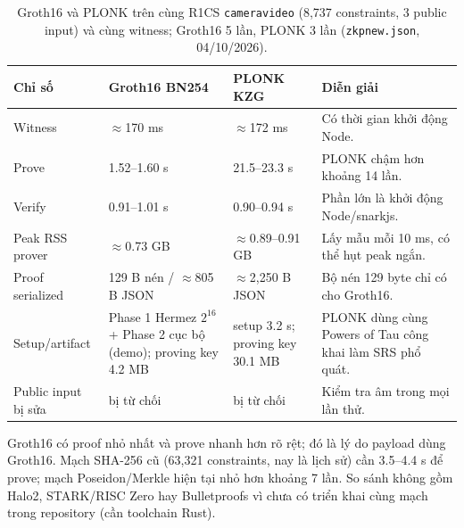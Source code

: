 \documentclass[11pt,a4paper]{article}
\renewcommand{\_}{\origunderscore\allowbreak}
\begin{document}
\begin{table}[H]\centering\small
\caption{Groth16 và PLONK trên cùng R1CS \texttt{camera\_video} (8,737 constraints, 3 public input) và cùng witness; Groth16 5 lần, PLONK 3 lần (\texttt{zkp\_new.json}, 04/10/2026).}
\begin{tabularx}{\textwidth}{p{3cm}p{3.1cm}p{3.1cm}X}\toprule
Chỉ số & Groth16 BN254 & PLONK KZG & Diễn giải\\\midrule
Witness & $\approx$170 ms & $\approx$172 ms & Có thời gian khởi động Node.\\
Prove & 1.52--1.60 s & 21.5--23.3 s & PLONK chậm hơn khoảng 14 lần.\\
Verify & 0.91--1.01 s & 0.90--0.94 s & Phần lớn là khởi động Node/snarkjs.\\
Peak RSS prover & $\approx$0.73 GB & $\approx$0.89--0.91 GB & Lấy mẫu mỗi 10 ms, có thể hụt peak ngắn.\\
Proof serialized & 129 B nén / $\approx$805 B JSON & $\approx$2,250 B JSON & Bộ nén 129 byte chỉ có cho Groth16.\\
Setup/artifact & Phase 1 Hermez $2^{16}$ + Phase 2 cục bộ (demo); proving key 4.2 MB & setup 3.2 s; proving key 30.1 MB & PLONK dùng cùng Powers of Tau công khai làm SRS phổ quát.\\
Public input bị sửa & bị từ chối & bị từ chối & Kiểm tra âm trong mọi lần thử.\\
\bottomrule\end{tabularx}
\end{table}
Groth16 có proof nhỏ nhất và prove nhanh hơn rõ rệt; đó là lý do payload dùng Groth16. Mạch SHA-256 cũ (63,321 constraints, nay là lịch sử) cần 3.5--4.4 s để prove; mạch Poseidon/Merkle hiện tại nhỏ hơn khoảng 7 lần. So sánh không gồm Halo2, STARK/RISC Zero hay Bulletproofs vì chưa có triển khai cùng mạch trong repository (cần toolchain Rust).
\end{document}
